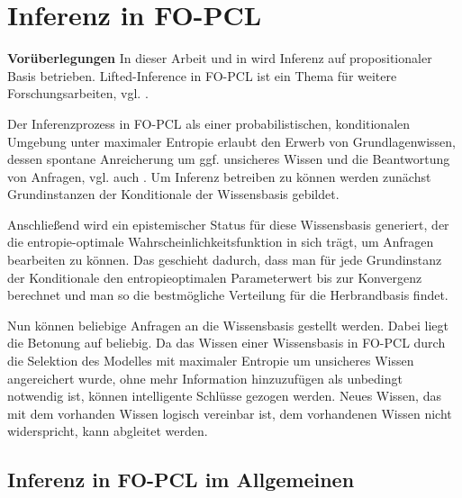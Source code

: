 \documentclass[a4paper, 11pt]{book}
\begin{document}
\chapter{Inferenz in FO-PCL}\label{Inferenz}
\textbf{Vorüberlegungen}
In dieser Arbeit und in \cite{Fis12} wird Inferenz auf propositionaler Basis betrieben. Lifted-Inference in FO-PCL ist ein Thema für weitere Forschungsarbeiten, vgl. \cite[Kap.8, S. 194]{Fis12}.

Der Inferenzprozess in FO-PCL als einer probabilistischen, konditionalen Umgebung unter maximaler Entropie erlaubt den Erwerb von Grundlagenwissen, dessen spontane Anreicherung um ggf. unsicheres Wissen und die Beantwortung von Anfragen, vgl. auch \cite{RRK06}.
Um Inferenz betreiben zu können werden zunächst Grundinstanzen der Konditionale der Wissensbasis gebildet.

 Anschließend wird ein epistemischer Status für diese Wissensbasis generiert, der die entropie-optimale Wahrscheinlichkeitsfunktion in sich trägt, um Anfragen bearbeiten zu können. Das geschieht dadurch, dass man für jede Grundinstanz der Konditionale den entropieoptimalen Parameterwert bis zur Konvergenz berechnet und man so die bestmögliche Verteilung für die Herbrandbasis findet.

Nun können beliebige Anfragen an die Wissensbasis gestellt werden. Dabei liegt die Betonung auf beliebig. Da das Wissen einer Wissensbasis in FO-PCL durch die Selektion des Modelles mit maximaler Entropie um unsicheres Wissen angereichert wurde, ohne mehr Information hinzuzufügen als unbedingt notwendig ist, können intelligente Schlüsse gezogen werden. Neues Wissen, das mit dem vorhanden Wissen logisch vereinbar ist, dem vorhandenen Wissen nicht widerspricht, kann abgleitet werden. 

\section{Inferenz in FO-PCL im Allgemeinen}
\end{document}
